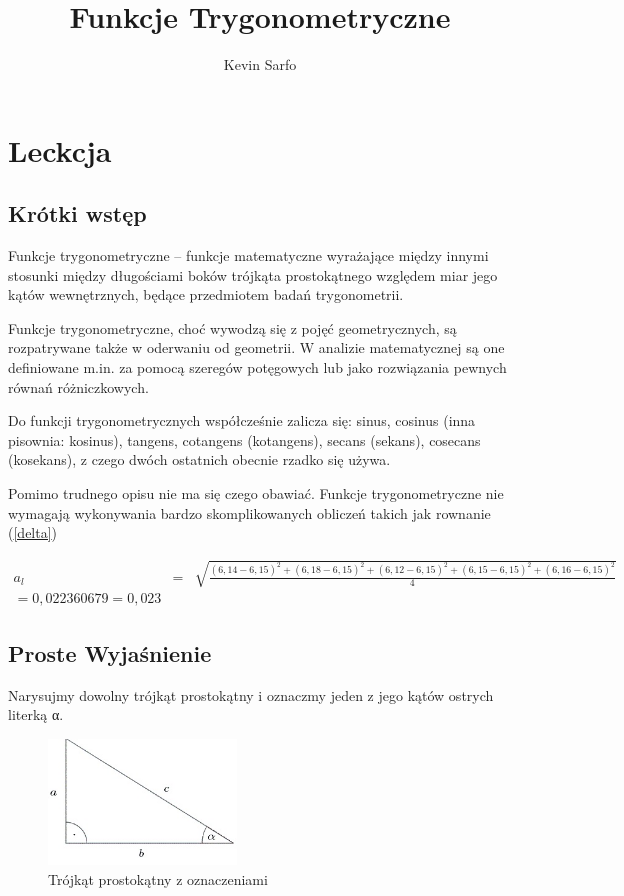 \documentclass[12pt,a4paper]{article}
\title{Funkcje Trygonometryczne}
\author{Kevin Sarfo}
\begin{document}
\maketitle

\tableofcontents
\newpage
\section{Leckcja}

\subsection{Krótki wstęp}

Funkcje trygonometryczne – funkcje matematyczne wyrażające między innymi stosunki między długościami boków trójkąta prostokątnego względem miar jego kątów wewnętrznych, będące przedmiotem badań trygonometrii.

Funkcje trygonometryczne, choć wywodzą się z pojęć geometrycznych, są rozpatrywane także w oderwaniu od geometrii. W analizie matematycznej są one definiowane m.in. za pomocą szeregów potęgowych lub jako rozwiązania pewnych równań różniczkowych.

Do funkcji trygonometrycznych współcześnie zalicza się: sinus, cosinus (inna pisownia: kosinus), tangens, cotangens (kotangens), secans (sekans), cosecans (kosekans), z czego dwóch ostatnich obecnie rzadko się używa.\cite{od}

Pomimo trudnego opisu nie ma się czego obawiać. Funkcje trygonometryczne nie wymagają wykonywania bardzo skomplikowanych obliczeń takich jak rownanie (\ref{delta})

\begin{equation}
\begin{array}{c} 
\label{delta}
a_l& =&\sqrt{\frac{(6,14-6,15)^2+(6,18-6,15)^2+(6,12-6,15)^2+
(6,15-6,15)^2+(6,16-6,15)^2}{4}} \\
=0,022360679=0,023
\end{array}
\end{equation}






\subsection{Proste Wyjaśnienie}

Narysujmy dowolny trójkąt prostokątny i oznaczmy jeden z jego kątów ostrych literką α.

\begin{figure}
\centering
\includegraphics[width=5cm]{troj}
\caption{Trójkąt prostokątny z oznaczeniami}
\label{fig:obrazek troj}
\end{figure}
\end{document}
